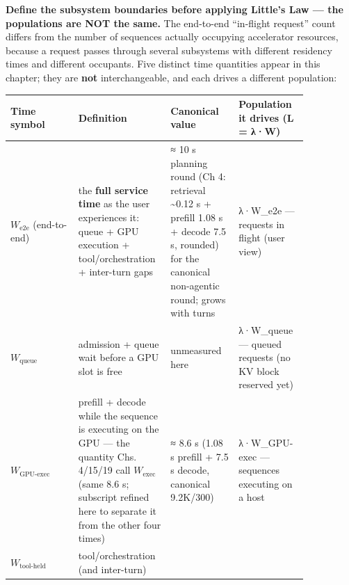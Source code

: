 \textbf{Define the subsystem boundaries before applying Little's Law ---
the populations are NOT the same.} The end-to-end ``in-flight request''
count differs from the number of sequences actually occupying
accelerator resources, because a request passes through several
subsystems with different residency times and different occupants. Five
distinct time quantities appear in this chapter; they are \textbf{not}
interchangeable, and each drives a different population:

\nopagebreak[4]
\begin{longtable}[]{@{}
  >{\raggedright\arraybackslash}p{0.2127\linewidth}
  >{\raggedright\arraybackslash}p{0.2127\linewidth}
  >{\raggedright\arraybackslash}p{0.2127\linewidth}
  >{\raggedright\arraybackslash}p{0.2127\linewidth}@{}}
\toprule\noalign{}
\begin{minipage}[b]{\linewidth}\raggedright
Time symbol
\end{minipage} & \begin{minipage}[b]{\linewidth}\raggedright
Definition
\end{minipage} & \begin{minipage}[b]{\linewidth}\raggedright
Canonical value
\end{minipage} & \begin{minipage}[b]{\linewidth}\raggedright
Population it drives (L = λ·W)
\end{minipage} \\
\midrule\noalign{}
\endhead
\bottomrule\noalign{}
\endlastfoot
\(W_{\mathrm{e2e}}\) (end-to-end) & the \textbf{full service time} as
the user experiences it: queue + GPU execution + tool/orchestration +
inter-turn gaps & ≈ 10 s planning round (Ch 4: retrieval
\textasciitilde0.12 s + prefill 1.08 s + decode 7.5 s, rounded) for the
canonical non-agentic round; grows with turns & λ·W\_e2e --- requests in
flight (user view) \\
\noalign{\label{tab:17.3}}
\(W_{\mathrm{queue}}\) & admission + queue wait before a GPU slot is
free & unmeasured here & λ·W\_queue --- queued requests (no KV block
reserved yet) \\
\(W_{\mathrm{GPU\text{-}exec}}\) & prefill + decode while the sequence
is executing on the GPU --- the quantity Chs. 4/15/19 call
\(W_{\mathrm{exec}}\) (same 8.6 s; subscript refined here to separate it
from the other four times) & ≈ 8.6 s (1.08 s prefill + 7.5 s decode,
canonical 9.2K/300) & λ·W\_GPU-exec --- sequences executing on a host \\
\(W_{\mathrm{tool\text{-}held}}\) & tool/orchestration (and inter-turn)

\end{longtable}
